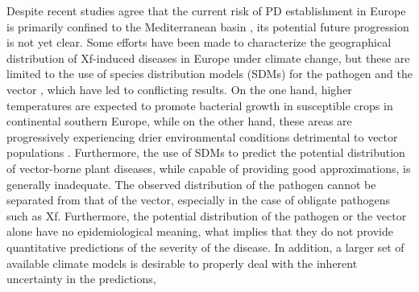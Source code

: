 Despite recent studies agree that the current risk of PD establishment in
Europe is primarily confined to the Mediterranean basin
\cite{godefroid2019xylella,Godefroid2022_vector,GimenezRomero2022_CommsBio},
its
potential future progression is not yet clear. Some efforts have been made to
characterize the geographical distribution of Xf-induced diseases in Europe
under climate change, but these are limited to the use of species distribution
models (SDMs) for the pathogen \cite{Bosso2016b,Schneider2020,Godefroid2022}
and the vector \cite{Godefroid2022_vector}, which have led to conflicting
results. On the one hand, higher temperatures are expected to promote bacterial
growth in susceptible crops in continental southern Europe, while on the other
hand, these areas are progressively experiencing drier environmental conditions
detrimental to vector populations \cite{Godefroid2022_vector}. Furthermore, the
use of SDMs to predict the potential distribution of vector-borne plant
diseases, while capable of providing good approximations, is generally
inadequate. The observed distribution of the pathogen cannot be separated from
that of the vector, especially in the case of obligate pathogens such as Xf.
Furthermore, the potential distribution of the pathogen or the vector alone
have no epidemiological meaning, what implies that they do not provide
quantitative predictions of the severity of the disease. In addition, a larger
set of available climate models is desirable to properly deal with the inherent
uncertainty in the predictions,

